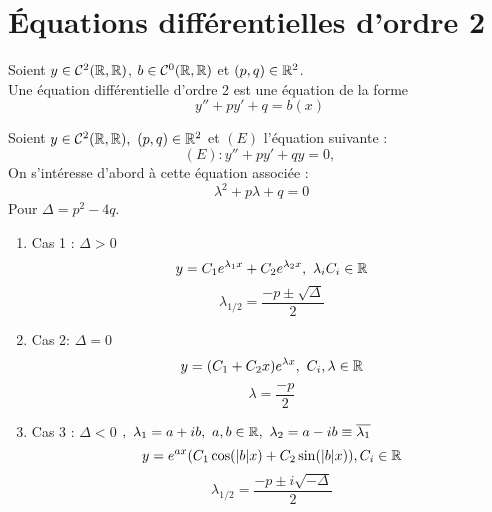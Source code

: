 \section{\'Equations différentielles d'ordre 2}

\begin{definition}
	Soient $y \in \mathcal{C}^2(\mathbb{R}, \mathbb{R})$, $b \in \mathcal{C}^0(\mathbb{R},\mathbb{R})$ et $(p, q) \in \mathbb{R}^2$. \\
	Une équation différentielle d'ordre 2 est une équation de la forme
	\[ y'' + py' + q = b(x) \]
\end{definition}

\begin{theorem}
  Soient $y \in \mathcal{C}^2(\mathbb{R},\mathbb{R}),\ (p, q) \in \mathbb{R}^2$ et $(E)$ l'équation suivante :
  \[ (E) : y'' + py' + qy = 0, \]
  On s'intéresse d'abord à cette équation associée :
  \[ \ \lambda^{2} + p\lambda + q = 0 \]
  Pour $\Delta = p^2 - 4q$. 
  \begin{enumerate}
	\item Cas 1 :
		  $\Delta > 0$
		  \[ y = C_{1} e^{\lambda_{1} x} + C_{2} e^{\lambda_{2} x},\ \lambda_{i} C_{i} \in \mathbb{R} \]
        \[ \lambda_{1/2} = \frac{-p \pm \sqrt{\Delta}}{2} \]
	\item Cas 2:
		  $\Delta = 0$
		  \[ y = (C_{1} + C_{2}x) e^{\lambda x},\ C_{i}, \lambda \in \mathbb{R} \]
        \[ \lambda = \frac{-p}{2} \]
	\item Cas 3 :
		  $\Delta < 0$
		  $,\ \lambda_{1} = a + ib,\ a, b \in \R,\ \lambda_{2} = a - ib \equiv \overline{\lambda_{1}}$
		  \[ y = e^{ax}(C_1 \cos(\abs{b}x) + C_2 \sin(\abs{b}x)), C_i \in \mathbb{R} \]
        \[ \lambda_{1/2} = \frac{-p \pm i \sqrt{-\Delta}}{2} \]
  \end{enumerate}
\end{theorem}

